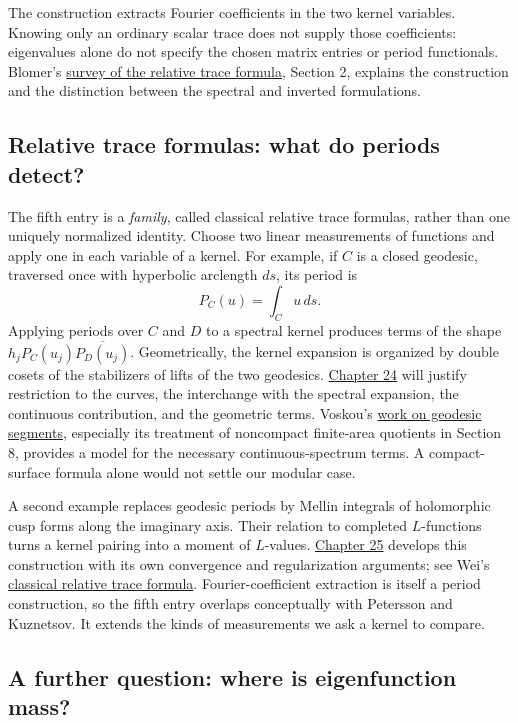The construction extracts Fourier coefficients in the two kernel variables. Knowing only an ordinary scalar trace does not supply those coefficients: eigenvalues alone do not specify the chosen matrix entries or period functionals. Blomer's \href{https://arxiv.org/abs/1912.08137}{survey of the relative trace formula}, Section 2, explains the construction and the distinction between the spectral and inverted formulations.

\subsection{Relative trace formulas: what do periods detect?}\label{relative-formula-preview}

The fifth entry is a \emph{family}, called classical relative trace formulas, rather than one uniquely normalized identity. Choose two linear measurements of functions and apply one in each variable of a kernel. For example, if \(C\) is a closed geodesic, traversed once with hyperbolic arclength \(ds\), its period is
\[
P_C(u)=\int_C u\,ds.
\]
Applying periods over \(C\) and \(D\) to a spectral kernel produces terms of the shape \(h_jP_C(u_j)\overline{P_D(u_j)}\). Geometrically, the kernel expansion is organized by double cosets of the stabilizers of lifts of the two geodesics. \hyperref[v1a-ch24]{Chapter 24} will justify restriction to the curves, the interchange with the spectral expansion, the continuous contribution, and the geometric terms. Voskou's \href{https://arxiv.org/abs/2407.03134}{work on geodesic segments}, especially its treatment of noncompact finite-area quotients in Section 8, provides a model for the necessary continuous-spectrum terms. A compact-surface formula alone would not settle our modular case.

A second example replaces geodesic periods by Mellin integrals of holomorphic cusp forms along the imaginary axis. Their relation to completed \(L\)-functions turns a kernel pairing into a moment of \(L\)-values. \hyperref[v1a-ch25]{Chapter 25} develops this construction with its own convergence and regularization arguments; see Wei's \href{https://arxiv.org/abs/2502.18593}{classical relative trace formula}. Fourier-coefficient extraction is itself a period construction, so the fifth entry overlaps conceptually with Petersson and Kuznetsov. It extends the kinds of measurements we ask a kernel to compare.

\subsection{A further question: where is eigenfunction mass?}\label{weighted-preview}

